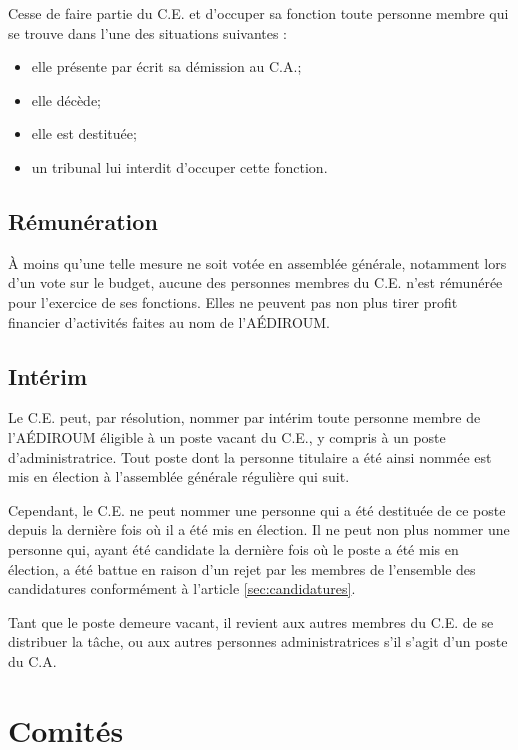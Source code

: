 \documentclass{aediroum}
\newcommand{\article}[1]{article \ref{#1}}
\begin{document}
Cesse de faire partie du C.E. et d'occuper sa fonction toute personne membre qui se trouve dans l'une des situations suivantes :

\begin{itemize}
    \item elle présente par écrit sa démission au C.A.;
    \item elle décède;
    \item elle est destituée;
    \item un tribunal lui interdit d'occuper cette fonction.
\end{itemize}

\subsection{Rémunération}\label{sec:renumeration}

À moins qu'une telle mesure ne soit votée en assemblée générale, notamment lors d'un vote sur le budget, aucune des personnes membres du C.E. n'est rémunérée pour l'exercice de ses fonctions. Elles ne peuvent pas non plus tirer profit financier d'activités faites au nom de l'AÉDIROUM.

\subsection{Intérim}\label{sec:interim}

Le C.E. peut, par résolution, nommer par intérim toute personne membre de l'AÉDIROUM éligible à un poste vacant du C.E., y compris à un poste d'administratrice. Tout poste dont la personne titulaire a été ainsi nommée est mis en élection à l'assemblée générale régulière qui suit.

Cependant, le C.E. ne peut nommer une personne qui a été destituée de ce poste depuis la dernière fois où il a été mis en élection. Il ne peut non plus nommer une personne qui, ayant été candidate la dernière fois où le poste a été mis en élection, a été battue en raison d'un rejet par les membres de l'ensemble des candidatures conformément à l'\article{sec:candidatures}.

Tant que le poste demeure vacant, il revient aux autres membres du C.E. de se distribuer la tâche, ou aux autres personnes administratrices s'il s'agit d'un poste du C.A.

\section{Comités}\label{sec:comites}
\end{document}
